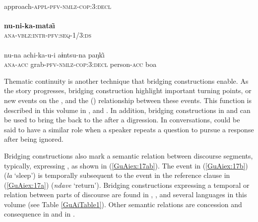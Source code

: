 \documentclass[output=paper]{LSP/langsci}
\begin{document}
\noindent\parbox{\textwidth}{\begin{exe}
\ex \label{GuAiex:36ac}
\begin{xlist}
\ex \label{GuAiex:36a}
\gll \underline{}\\
 approach-\textsc{appl-pfv-nmlz-cop:3:decl}\\
\glt {} \\
\ex \label{GuAiex:36b}
\gll  \textbf{nu-ni-ka-mata\~\i}\\
\textsc{ana-vblz:intr}{}-\textsc{pfv:seq-1/3:ds}\\
\glt {}\\
\ex \label{GuAiex:36c}
\gll  nu-na         achi-ka-u-i                         aɨntsu-na   paŋk\~\i\\
\textsc{ana-acc}   grab-\textsc{pfv-nmlz-cop:3:decl}   person-\textsc{acc}   boa\\
\glt {}
\end{xlist}
\end{exe}}


Thematic continuity is another  technique that bridging constructions enable. As the story progresses, bridging construction highlight important turning points, or new events on the , and the () relationship between these events. This function is described in this volume in ,  and . In addition, bridging constructions in  and  can be used to bring the  back to the  after a digression. In  conversations,  could be said to have a similar role when a speaker repeats a question to pursue a response after being ignored.

Bridging constructions also mark a semantic relation between discourse segments, typically, expressing , as shown in (\ref{GuAiex:17ab}). The event in (\ref{GuAiex:17b}) (\textit{la} `sleep') is temporally subsequent to the event in the reference clause in (\ref{GuAiex:17a}) (\textit{ndave} `return'). Bridging constructions expressing a temporal or  relation between parts of discourse are found in  \citep[][314]{bromley81},  \citep[][516]{kasia17}, and several languages in this volume (see Table \ref{GuAiTable1}). Other semantic relations are concession and consequence in   and in  \citep[][499--502]{overall17}. 
\end{document}
